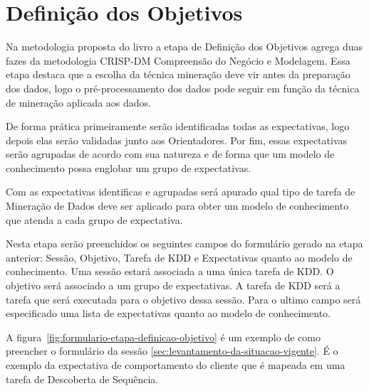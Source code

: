 \documentclass[diss,capa]{texufpel}
\begin{document}
    
    \section{Definição dos Objetivos}
    \label{sec:definicao-dos-objetivos}
    
    Na metodologia proposta do livro a etapa de Definição dos Objetivos agrega duas fazes da metodologia CRISP-DM Compreensão do Negócio e Modelagem. Essa etapa destaca que a escolha da técnica mineração deve vir antes da preparação dos dados, logo o pré-processamento dos dados pode seguir em função da técnica de mineração aplicada aos dados.
    
    De forma prática primeiramente serão identificadas todas as expectativas, logo depois elas serão validadas junto aos Orientadores. Por fim, essas expectativas serão agrupadas de acordo com sua natureza e de forma que um modelo de conhecimento possa englobar um grupo de expectativas.
    
    Com as expectativas identificas e agrupadas será apurado qual tipo de tarefa de Mineração de Dados deve ser aplicado para obter um modelo de conhecimento que atenda a cada grupo de expectativa.
    
    Nesta etapa serão preenchidos os seguintes campos do formulário gerado na etapa anterior: Sessão, Objetivo, Tarefa de KDD e Expectativas quanto ao modelo de conhecimento.
    Uma sessão estará associada a uma única tarefa de KDD. O objetivo será associado a um grupo de expectativas. A tarefa de KDD será a tarefa que será executada para o objetivo dessa sessão. Para o ultimo campo será especificado uma lista de expectativas quanto ao modelo de conhecimento.
    
    A figura~\ref{fig:formulario-etapa-definicao-objetivo} é um exemplo de como preencher o formulário da sessão \ref{sec:levantamento-da-situacao-vigente}. É o exemplo da expectativa de comportamento do cliente que é mapeada em uma tarefa de Descoberta de Sequência.
    
\end{document}
